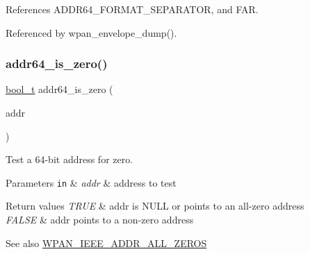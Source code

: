 References A\+D\+D\+R64\+\_\+\+F\+O\+R\+M\+A\+T\+\_\+\+S\+E\+P\+A\+R\+A\+T\+OR, and F\+AR.



Referenced by wpan\+\_\+envelope\+\_\+dump().

\mbox{\label{group__wpan__types_ga9795dea7f415ceb7502f39a78ebadfc1}} 
\subsubsection{\texorpdfstring{addr64\+\_\+is\+\_\+zero()}{addr64\_is\_zero()}}
{\footnotesize\ttfamily \hyperlink{group__hal__dos_ga04dd5074964518403bf944f2b240a5f8}{bool\+\_\+t} addr64\+\_\+is\+\_\+zero (\begin{DoxyParamCaption}\item[{const \hyperlink{unionaddr64}{addr64} \hyperlink{group__hal_gaef060b3456fdcc093a7210a762d5f2ed}{F\+AR} $\ast$}]{addr }\end{DoxyParamCaption})}



Test a 64-\/bit address for zero. 


\begin{DoxyParams}[1]{Parameters}
\mbox{\tt in}  & {\em addr} & address to test\\
\hline
\end{DoxyParams}

\begin{DoxyRetVals}{Return values}
{\em T\+R\+UE} & {\ttfamily addr} is N\+U\+LL or points to an all-\/zero address \\
\hline
{\em F\+A\+L\+SE} & {\ttfamily addr} points to a non-\/zero address\\
\hline
\end{DoxyRetVals}
\begin{DoxySeeAlso}{See also}
\hyperlink{group__wpan__types_ga014f9d0857312b6a7f80ee10ecfd0935}{W\+P\+A\+N\+\_\+\+I\+E\+E\+E\+\_\+\+A\+D\+D\+R\+\_\+\+A\+L\+L\+\_\+\+Z\+E\+R\+OS} 
\end{DoxySeeAlso}
\mbox{\label{group__wpan__types_ga500b175732df9779b3670e2ba1402530}} 
